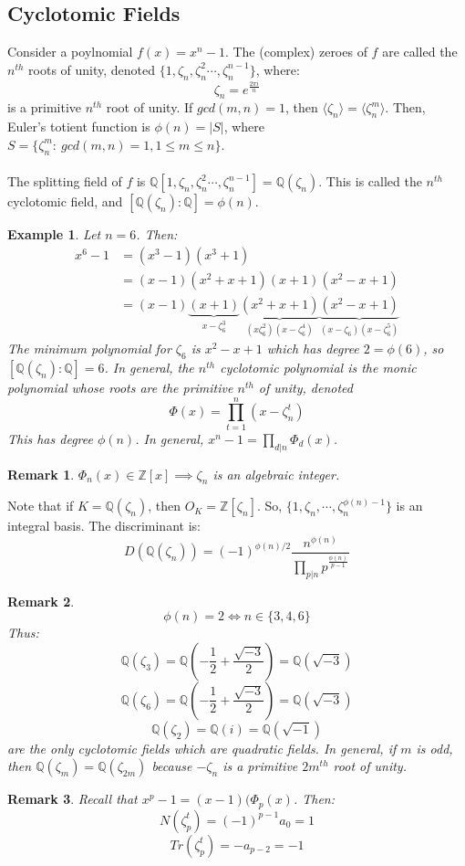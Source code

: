 \documentclass{article}
\newcommand{\Q}{\mathbb{Q}}
\newcommand{\Z}{\mathbb{Z}}
\newtheorem{remark}{Remark}[subsection]
\newtheorem{example}{Example}[subsection]
\begin{document}
      \subsection{Cyclotomic Fields}
      Consider a poylnomial $f(x)=x^n-1$. The (complex) zeroes of $f$ are called the $n^{th}$ roots of unity, denoted $\{1,\zeta_n,\zeta_n^2\cdots, \zeta_n^{n-1}\}$, where:
      $$\zeta_n = e^{\frac{2\pi i}{n}}$$
      is a primitive $n^{th}$ root of unity. If $gcd(m,n)=1$, then $\langle \zeta_n\rangle = \langle \zeta_n^m\rangle$. Then, Euler's totient function is $\phi(n)=|S|$, where $S=\{\zeta_n^m:\ gcd(m,n)=1, 1\leq m\leq n\}$.
      \\
      \\
      The splitting field of $f$ is $\Q[1,\zeta_n,\zeta_n^2\cdots, \zeta_n^{n-1}]=\Q(\zeta_n)$. This is called the $n^{th}$ cyclotomic field, and $[\Q(\zeta_n):\Q]=\phi(n)$.
      \begin{example}
      Let $n=6$. Then:
      \begin{align*}
          x^6-1 &=(x^3-1)(x^3+1)\\
          &=(x-1)(x^2+x+1)(x+1)(x^2-x+1)\\
          &=(x-1)\underbrace{(x+1)}_{x-\zeta_6^3}\underbrace{(x^2+x+1)}_{(x\zeta_6^2)(x-\zeta_6^4)}\underbrace{(x^2-x+1)}_{(x-\zeta_6)(x-\zeta_6^5)}
      \end{align*}
      The minimum polynomial for $\zeta_6$ is $x^2-x+1$ which has degree $2=\phi(6)$, so $[\Q(\zeta_n):\Q]=6$. In general, the $n^{th}$ cyclotomic polynomial is the monic polynomial whose roots are the primitive $n^{th}$ of unity, denoted $$\Phi(x)=\displaystyle\prod_{t=1}^n(x-\zeta_n^t)$$
      This has degree $\phi(n)$. In general, $x^n-1=\displaystyle\prod_{d|n}\Phi_d(x)$.
      \end{example}
      \begin{remark}
      $\Phi_n(x)\in\Z[x]\implies \zeta_n$ is an algebraic integer.
      \end{remark}
      \noindent Note that if $K=\Q(\zeta_n)$, then $O_K=\Z[\zeta_n]$. So, $\{1,\zeta_n,\cdots, \zeta_n^{\phi(n)-1}\}$ is an integral basis. The discriminant is:
      $$D(\Q(\zeta_n))=(-1)^{\phi(n)/2}\frac{n^{\phi(n)}}{\displaystyle\prod_{p|n}p^{\frac{\phi(n)}{p-1}}}$$
      \begin{remark}
      $$\phi(n)=2\iff n\in\{3,4,6\}$$
      Thus: 
      $$\Q(\zeta_3)=\Q\left(-\frac{1}{2}+\frac{\sqrt{-3}}{2}\right)=\Q(\sqrt{-3})$$
      $$\Q(\zeta_6)=\Q\left(-\frac{1}{2}+\frac{\sqrt{-3}}{2}\right)=\Q(\sqrt{-3})$$
      $$\Q(\zeta_2)=\Q(i)=\Q(\sqrt{-1})$$
      are the only cyclotomic fields which are quadratic fields. In general, if $m$ is odd, then $\Q(\zeta_m)=\Q(\zeta_{2m})$ because $-\zeta_n$ is a primitive $2m^{th}$ root of unity.
      \end{remark}
      \begin{remark}
      Recall that $x^p-1 = (x-1)(\Phi_p(x)$. Then:
      $$N(\zeta_p^t)=(-1)^{p-1}a_0=1$$
      $$Tr(\zeta_p^t)=-a_{p-2}=-1$$
      \end{remark}
      \newpage
\end{document}
